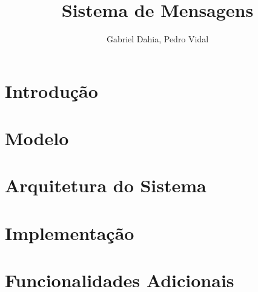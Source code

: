 \documentclass{article}
\title{Sistema de Mensagens}
\author{Gabriel Dahia, Pedro Vidal}
\begin{document}
 
\maketitle
 
\section{Introdução} \label{sec:intro}
 


\section{Modelo} \label{sec:model}
 


\section{Arquitetura do Sistema} \label{sec:arc}



\section{Implementação} \label{sec:impl}


 
\section{Funcionalidades Adicionais} \label{sec:feat}
 

 
\end{document}
